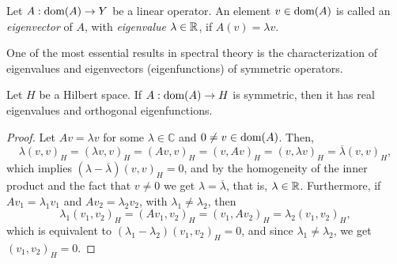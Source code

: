 \begin{definition}
    Let $A:\operatorname{\text{dom}}(A)\to Y$ be a linear operator. An element $v\in \operatorname{\text{dom}}(A)$ is called an \textit{eigenvector} of $A$, with \textit{eigenvalue} $\lambda\in\mathbb{R}$, if $A(v) = \lambda v$. 
\end{definition}

One of the most essential results in spectral theory is the characterization of eigenvalues and eigenvectors (eigenfunctions) of symmetric operators. 
\begin{theorem}
    Let $H$ be a Hilbert space. If $A:\operatorname{\text{dom}}(A)\to H$ is symmetric, then it has real eigenvalues and orthogonal eigenfunctions. 
    \begin{proof}
        Let $Av=\lambda v$ for some $\lambda\in\mathbb{C}$ and $0\neq v\in\operatorname{\text{dom}}(A)$. Then, 
        \begin{equation*}
            \lambda(v,v)_H = (\lambda v, v)_H = (Av,v)_H = (v,Av)_H = (v,\lambda v)_H = \overline{\lambda}(v,v)_H,
        \end{equation*}
        which implies $(\lambda-\overline{\lambda})(v,v)_H=0$, and by the homogeneity of the inner product and the fact that $v\neq 0$ we get $\lambda=\overline{\lambda}$, that is, $\lambda\in\mathbb{R}$. Furthermore, if $Av_1=\lambda_1v_1$ and $Av_2=\lambda_2v_2$, with $\lambda_1\neq\lambda_2$, then 
        \begin{equation*}
            \lambda_1(v_1,v_2)_H = (Av_1,v_2)_H = (v_1,Av_2)_H = \lambda_2(v_1,v_2)_H,
        \end{equation*}
        which is equivalent to $(\lambda_1-\lambda_2)(v_1,v_2)_H = 0$, and since $\lambda_1\neq\lambda_2$, we get $(v_1,v_2)_H = 0$.
    \end{proof}
\end{theorem}

